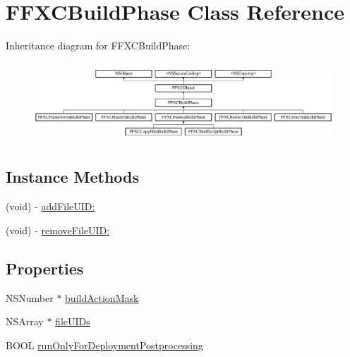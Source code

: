 \hypertarget{interface_f_f_x_c_build_phase}{\section{F\-F\-X\-C\-Build\-Phase Class Reference}
\label{interface_f_f_x_c_build_phase}
}
Inheritance diagram for F\-F\-X\-C\-Build\-Phase\-:\begin{figure}[H]
\begin{center}
\leavevmode
\includegraphics[height=3.010753cm]{interface_f_f_x_c_build_phase}
\end{center}
\end{figure}
\subsection*{Instance Methods}
\begin{DoxyCompactItemize}
\item 
(void) -\/ \hyperlink{interface_f_f_x_c_build_phase_a279a461fc0b088993ed492c6747d1c17}{add\-File\-U\-I\-D\-:}
\item 
(void) -\/ \hyperlink{interface_f_f_x_c_build_phase_a4142ccda1cc2d584e530e0e02c808354}{remove\-File\-U\-I\-D\-:}
\end{DoxyCompactItemize}
\subsection*{Properties}
\begin{DoxyCompactItemize}
\item 
N\-S\-Number $\ast$ \hyperlink{interface_f_f_x_c_build_phase_ac85da98724c7e8bd08ebd98c4e3272b8}{build\-Action\-Mask}
\item 
N\-S\-Array $\ast$ \hyperlink{interface_f_f_x_c_build_phase_a82969b0ed97364d87834f332419cd2b9}{file\-U\-I\-Ds}
\item 
B\-O\-O\-L \hyperlink{interface_f_f_x_c_build_phase_aaa07d7e555511a6bfd68c7a9998e0334}{run\-Only\-For\-Deployment\-Postprocessing}
\end{DoxyCompactItemize}


